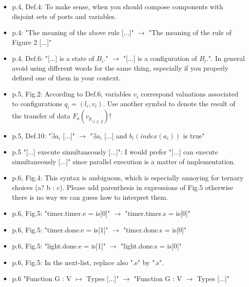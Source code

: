 \begin{itemize}
\item p.4, Def.4: To make sense, when you should compose components with disjoint 
sets of ports and variables.
\item p.4: "The meaning of the above rule [...]" $\rightarrow$ "The meaning of the rule of 
Figure 2 [...]"
\item p.4, Def.6: "[...] is a state of $B_i$." $\rightarrow$ "[...] is a configuration of 
$B_i$.". In general avoid using different words for the same thing, especially 
if you properly defined one of them in your context.
\done
{}


\item p.5, Fig.2: According to Def.6, variables $v_i$ correspond valuations 
associated to configurations $q_i = (l_i, v_i)$. Use another symbol to denote 
the result of the transfer of data $F_a({ v_{p_i} }_{i \in I})$!
\done

\item p.5, Def.10: "$\exists a_i$ [...]" $\rightarrow$ "$\exists a_i$ [...] and $b_i(index(a_i))$ is 
true"
\done

\item p.5 "[...] execute simultaneously [...]": I would prefer "[...] can execute 
simultaneously [...]" since parallel execution is a matter of implementation.
\done
{}

\item p.6, Fig.4: This syntax is ambiguous, which is especially annoying for 
ternary choices (a? b : c). Please add parenthesis in expressions of Fig.5 
otherwise there is no way we can guess how to interpret them.
\done

\item p.6, Fig.5: "timer.timer.e = is[0]" $\rightarrow$ "timer.timer.s = is[0]"
\done

\item p.6, Fig.5: "timer.done.e = is[1]" $\rightarrow$ "timer.done.s = is[0]"
\done

\item p.6, Fig.5: "light.done.e = is[1]" $\rightarrow$ "light.done.s = is[0]"
\done

\item p.6, Fig.5: In the next-list, replace also ".e" by ".s".
\done

\item p.6 "Function G : V $\mapsto$ Types [...]" $\rightarrow$ "Function G : V $\to$ Types 
[...]"
\done


\end{itemize}
